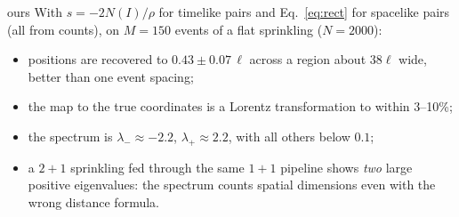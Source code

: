 \documentclass[11pt,a4paper]{article}
\newcommand{\tagbox}[2]{\textsf{\scriptsize\colorbox{#1!12}{\textcolor{#1!70!black}{#2}}}}
\newcommand{\ours}{\tagbox{orange}{ours}}
\begin{document}
\ours{} With $s=-2N(I)/\rho$ for timelike pairs and Eq.~\eqref{eq:rect} for spacelike pairs (all from counts), on $M=150$ events of a flat sprinkling ($N=2000$):
\begin{itemize}[leftmargin=*,itemsep=1pt]
\item positions are recovered to $0.43\pm0.07\,\ell$ across a region about $38\ell$ wide, better than one event spacing;
\item the map to the true coordinates is a Lorentz transformation to within 3--10\%;
\item the spectrum is $\lambda_-\approx-2.2$, $\lambda_+\approx2.2$, with all others below $0.1$;
\item a $2+1$ sprinkling fed through the same $1+1$ pipeline shows \emph{two} large positive eigenvalues: the spectrum counts spatial dimensions even with the wrong distance formula.
\end{itemize}
\end{document}

